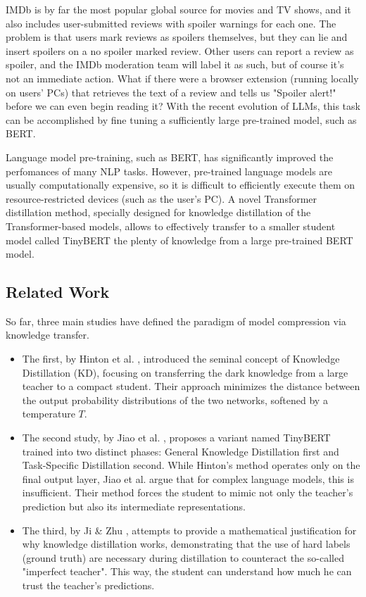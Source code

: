 \documentclass[11pt, a4paper]{article}
\begin{document}
IMDb is by far the most popular global source for movies and TV shows, and it also includes user-submitted reviews with spoiler warnings for each one. The problem is that users mark reviews as spoilers themselves, but they can lie and insert spoilers on a no spoiler marked review. Other users can report a review as spoiler, and the IMDb moderation team will label it as such, but of course it's not an immediate action. What if there were a browser extension (running locally on users' PCs) that retrieves the text of a review and tells us "Spoiler alert!" before we can even begin reading it? With the recent evolution of LLMs, this task can be accomplished by fine tuning a sufficiently large pre-trained model, such as BERT.

Language model pre-training, such as BERT, has significantly improved the perfomances of many NLP tasks. However, pre-trained language models are usually computationally expensive, so it is difficult to efficiently execute them on resource-restricted devices (such as the user's PC). A novel Transformer distillation method, specially designed for knowledge distillation of the Transformer-based models, allows to effectively transfer to a smaller student model called TinyBERT the plenty of knowledge from a large pre-trained BERT model. \cite{jiao2020tinybertdistillingbertnatural}
\subsection{Related Work}
So far, three main studies have defined the paradigm of model compression via knowledge transfer. 
\begin{itemize}
  \item The first, by Hinton et al. \cite{hinton2015distillingknowledgeneuralnetwork}, introduced the seminal concept of Knowledge Distillation (KD), focusing on transferring the dark knowledge from a large teacher to a compact student. Their approach minimizes the distance between the output probability distributions of the two networks, softened by a temperature $ T $. 
  \item The second study, by Jiao et al. \cite{jiao2020tinybertdistillingbertnatural}, proposes a variant named TinyBERT trained into two distinct phases: General Knowledge Distillation first and Task-Specific Distillation second. While Hinton’s method operates only on the final output layer, Jiao et al. argue that for complex language models, this is insufficient. Their method forces the student to mimic not only the teacher's prediction but also its intermediate representations. 
  \item The third, by Ji \& Zhu \cite{ji2020knowledgedistillationwideneural}, attempts to provide a mathematical justification for why knowledge distillation works, demonstrating that the use of hard labels (ground truth) are necessary during distillation to counteract the so-called "imperfect teacher". This way, the student can understand how much he can trust the teacher's predictions.
\end{itemize}
\end{document}

